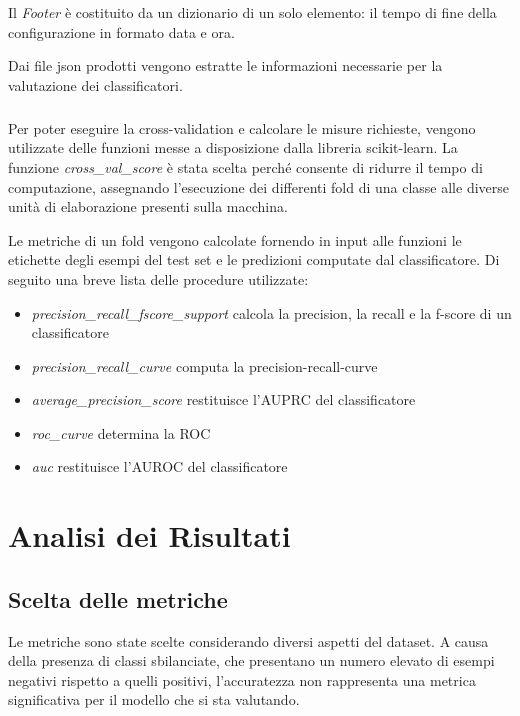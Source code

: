 \documentclass[12pt,a4paper,oneside,hidelinks]{report}
\begin{document}
Il \textit{Footer} è costituito da un dizionario di un solo elemento: il tempo di fine della configurazione in formato data e ora.

Dai file json prodotti vengono estratte le informazioni necessarie per la valutazione dei classificatori.

\paragraph*{}
Per poter eseguire la cross-validation e calcolare le misure richieste, vengono utilizzate delle funzioni messe a disposizione dalla libreria scikit-learn.
La funzione \textit{cross\_val\_score} è stata scelta perché consente di ridurre il tempo di computazione, assegnando l'esecuzione dei differenti fold di una classe alle diverse unità di elaborazione presenti sulla macchina.

Le metriche di un fold vengono calcolate fornendo in input alle funzioni le etichette degli esempi del test set e le predizioni computate dal classificatore. Di seguito una breve lista delle procedure utilizzate:

\begin{itemize}
\item \textit{precision\_recall\_fscore\_support} calcola la precision, la recall e la f-score di un classificatore

\item \textit{precision\_recall\_curve} computa la precision-recall-curve

\item \textit{average\_precision\_score} restituisce l'AUPRC del classificatore 

\item \textit{roc\_curve} determina la ROC

\item \textit{auc} restituisce l'AUROC del classificatore
\end{itemize}


\chapter{Analisi dei Risultati}
\label{chap:risultati}

\section{Scelta delle metriche}
Le metriche sono state scelte considerando diversi aspetti del dataset.
A causa della presenza di classi sbilanciate, che presentano un numero elevato di esempi negativi rispetto a quelli positivi, l'accuratezza non rappresenta una metrica significativa per il modello che si sta valutando.
\end{document}
